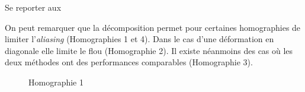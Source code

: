 

Se reporter aux %

On peut remarquer que la décomposition permet pour certaines homographies de limiter l'\emph{aliasing} (Homographies 1 et 4). Dans le cas d'une déformation en diagonale elle limite le flou (Homographie 2). Il existe néanmoins des cas où les deux méthodes ont des performances comparables (Homographie 3).

\begin{figure}
\caption{Homographie 1}
\label{Homo1}
\end{figure}


